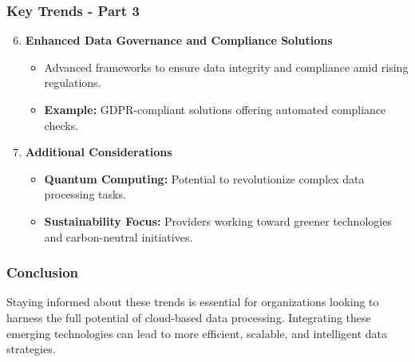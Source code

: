 \documentclass{beamer}
\begin{document}
\begin{frame}[fragile]
    \frametitle{Key Trends - Part 3}
    \begin{enumerate}
        \setcounter{enumi}{5} %
        \item \textbf{Enhanced Data Governance and Compliance Solutions}
            \begin{itemize}
                \item Advanced frameworks to ensure data integrity and compliance amid rising regulations.
                \item \textbf{Example:} GDPR-compliant solutions offering automated compliance checks.
            \end{itemize}
        
        \item \textbf{Additional Considerations}
            \begin{itemize}
                \item \textbf{Quantum Computing:} Potential to revolutionize complex data processing tasks.
                \item \textbf{Sustainability Focus:} Providers working toward greener technologies and carbon-neutral initiatives.
            \end{itemize}
    \end{enumerate}
\end{frame}

\begin{frame}[fragile]
    \frametitle{Conclusion}
    Staying informed about these trends is essential for organizations looking to harness the full potential of cloud-based data processing. Integrating these emerging technologies can lead to more efficient, scalable, and intelligent data strategies.
\end{frame}
\end{document}
